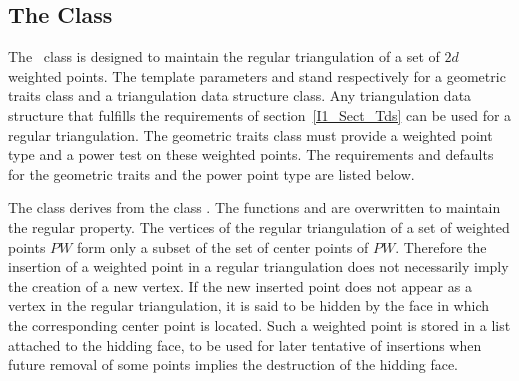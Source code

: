 \subsection{ The  Class \protect {}}
The \cgal\  class 
 is designed to maintain the
regular triangulation of a set of $2d$ weighted points.
The template parameters   and  stand respectively
 for a geometric traits class and a triangulation data structure class.
Any triangulation data structure that fulfills the requirements of 
section~\ref{I1_Sect_Tds} can be used for a regular triangulation.
The geometric traits class must provide a weighted point type
and a power test on these weighted points. The requirements and defaults
for the geometric traits and the power point type are listed below.



The class 
derives from the class .
The
functions  and 
 are overwritten to maintain the regular
property.
The vertices of the regular triangulation
of a set of weighted points ${  PW}$ form only a subset
of the set of center points of ${   PW}$.
Therefore the  insertion of a weighted point  in a regular triangulation
does not necessarily imply the creation of a new vertex.
If the new inserted point does not appear as a vertex in the
regular triangulation, it is said to be hidden 
by the face in which the corresponding center point is located.
Such a weighted point is stored in a list attached to the hidding face,
to be used for later tentative of insertions when future removal
of some points implies the destruction of the hidding face.







